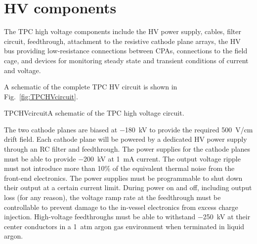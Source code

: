 




\section{HV components}

The TPC high voltage components include the HV power supply, cables,
filter circuit, feedthrough, attachment to the resistive cathode plane
arrays, the HV bus providing low-resistance connections between CPAs,
connections to the field cage, and devices for monitoring steady state
and transient conditions of current and voltage.

A schematic of the complete TPC HV circuit is shown in Fig.\ \ref{fig:TPCHVcircuit}.

\begin{cdrfigure}{TPCHVcircuit}{A schematic of the TPC high voltage circuit.}
\end{cdrfigure}


The two cathode planes are biased at \SI{-180}{kV} to provide the
required \SI{500}{V/cm} drift field.  Each cathode plane will be
powered by a dedicated HV power supply through an RC filter and
feedthrough.  The power supplies for the cathode planes must be able
to provide \SI{-200}{kV} at \SI{1}{mA} current.  The output voltage
ripple must not introduce more than 10\% of the equivalent thermal
noise from the front-end electronics. The power supplies must be
programmable to shut down their output at a certain current
limit. During power on and off, including output loss (for any
reason), the voltage ramp rate at the feedthrough must be controllable
to prevent damage to the in-vessel electronics from excess charge
injection. High-voltage feedthroughs must be able to withstand \SI{-250}{kV}
at their center conductors in a \SI{1}{atm} argon gas environment when
terminated in liquid argon.

